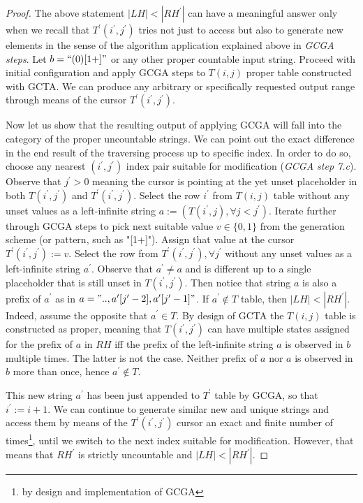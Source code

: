 \begin{proof}The above statement  $|LH| < |RH^\prime|$ can have a meaningful answer only when we recall that $T^\prime(i^\prime,j^\prime)$ tries not just to access but also to generate new elements in the sense of the algorithm application explained above in \textit{GCGA steps}. Let $b = \text{``}(0)[1+]\text{''}$ or any other proper countable input string. Proceed with initial configuration and apply GCGA steps to $T(i,j)$ proper table constructed with GCTA. We can produce any arbitrary or specifically requested output range through means of the cursor $T^\prime(i^\prime,j^\prime)$.

  Now let us show that the resulting output of applying GCGA will fall into the category of the proper uncountable strings. We can point out the exact difference in the end result of the traversing process up to specific index. In order to do so, choose any nearest $(i^\prime,j^\prime)$ index pair suitable for modification (\textit{GCGA step 7.c}). Observe that $j^\prime > 0$ meaning the cursor is pointing at the yet unset placeholder in both $T(i^\prime,j^\prime)$ and $T^\prime(i^\prime,j^\prime)$. Select the row $i^\prime$ from $T(i,j)$ table without any unset values as a left-infinite string $a := (T(i^\prime,j), \forall j < j^\prime)$. Iterate further through GCGA steps to pick next suitable value $v \in \{0, 1\}$ from the generation scheme (or pattern, such as "[1+]"). Assign that value at the cursor $T^\prime(i^\prime,j^\prime) := v$. Select the row from $T^\prime(i^\prime,j^\prime), \forall j^\prime$ without any unset values as a left-infinite string $a^\prime$. Observe that $a^\prime \neq a$ and is different up to a single placeholder that is still unset in $T(i^\prime,j^\prime)$. Then notice that string $a$ is also a prefix of $a^\prime$ as in $a = ".., a^\prime[j^\prime-2], a^\prime[j^\prime-1]"$. If $a^\prime \notin T$ table, then $|LH| < |RH^\prime|$. Indeed, assume the opposite that $a^\prime \in T$. By design of GCTA the $T(i,j)$ table is constructed as proper, meaning that $T(i^\prime,j^\prime)$ can have multiple states assigned for the prefix of $a$ in $RH$ iff the prefix of the left-infinite string $a$ is observed in $b$ multiple times. The latter is not the case. Neither prefix of $a$ nor $a$ is observed in $b$ more than once, hence $a^\prime \notin T$.

  This new string $a^\prime$ has been just appended to $T^\prime$ table by GCGA, so that $i^\prime := i + 1$. We can continue to generate similar new and unique strings and access them by means of the $T^\prime(i^\prime,j^\prime)$ cursor an exact and finite number of times\footnote{by design and implementation of GCGA}, until we switch to the next index suitable for modification. However, that means that $RH^\prime$ is strictly uncountable and $|LH| < |RH^\prime|$. \end{proof}

